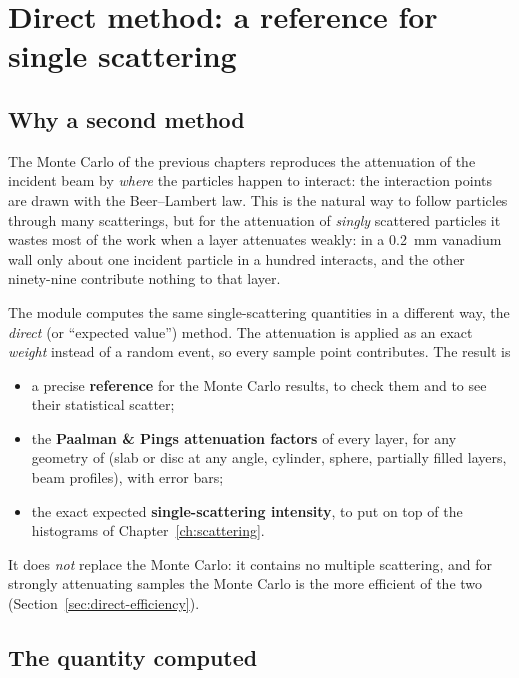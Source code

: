 \chapter{Direct method: a reference for single scattering}
\label{ch:direct}

\section{Why a second method}

The Monte Carlo of the previous chapters reproduces the attenuation of the incident beam by \emph{where} the particles happen to interact: the
interaction points are drawn with the Beer--Lambert law. This is the natural way to follow particles through many scatterings, but for the
attenuation of \emph{singly} scattered particles it wastes most of the work when a layer attenuates weakly: in a 0.2~mm vanadium wall only about one
incident particle in a hundred interacts, and the other ninety-nine contribute nothing to that layer.

The module  computes the same single-scattering quantities in a different way, the \emph{direct} (or ``expected value'')
method. The attenuation is applied as an exact \emph{weight} instead of a random event, so every sample point contributes. The result is
\begin{itemize}
  \item a precise \textbf{reference} for the Monte Carlo results, to check them and to see their statistical scatter;
  \item the \textbf{Paalman \& Pings attenuation factors} of every layer, for any geometry of \mcams{} (slab or disc at any angle, cylinder, sphere, partially filled
        layers, beam profiles), with error bars;
  \item the exact expected \textbf{single-scattering intensity}, to put on top of the histograms of Chapter~\ref{ch:scattering}.
\end{itemize}
It does \emph{not} replace the Monte Carlo: it contains no multiple scattering, and for strongly attenuating samples the Monte Carlo is the more
efficient of the two (Section~\ref{sec:direct-efficiency}).

\section{The quantity computed}
\label{sec:direct-def}

